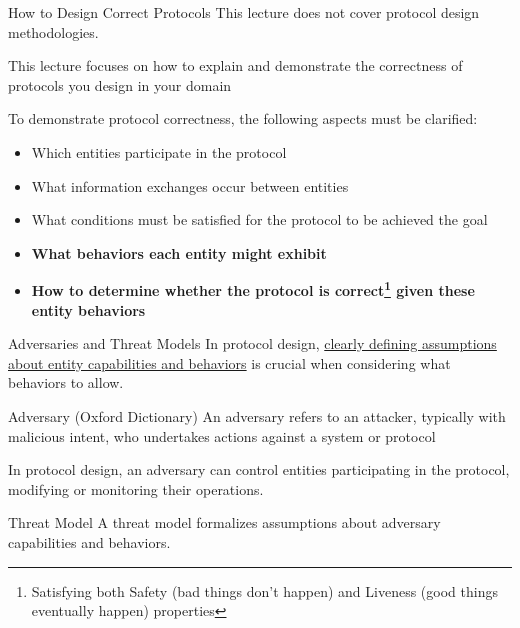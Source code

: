 \documentclass[aspectratio=169,10pt]{beamer}
\newenvironment{proofblock}[1][]
{\begin{block}{#1}\vspace{0.5em}}
{\vspace{0.5em}\end{block}}
\newenvironment{outlineblock}[1][]
{\begin{tcolorbox}[colframe=black, colback=white, boxrule=1pt, boxsep=5pt]}
{\end{tcolorbox}}
\begin{document}
\begin{frame}{How to Design Correct Protocols}
This lecture does not cover protocol design methodologies.

\begin{outlineblock}[]
    This lecture focuses on how to explain and demonstrate the correctness of protocols you design in your domain
\end{outlineblock}

To demonstrate protocol correctness, the following aspects must be clarified:
\begin{itemize}
    \item Which entities participate in the protocol
    \item What information exchanges occur between entities
    \item What conditions must be satisfied for the protocol to be achieved the goal
    \item \textbf{What behaviors each entity might exhibit}
    \item \textbf{How to determine whether the protocol is correct\footnote{Satisfying both Safety (bad things don't happen) and Liveness (good things eventually happen) properties} given these entity behaviors}
\end{itemize}

\end{frame}


\begin{frame}{Adversaries and Threat Models}
In protocol design, \underline{clearly defining assumptions about entity capabilities and behaviors} is crucial when considering what behaviors to allow.

\begin{proofblock}[Adversary (Oxford Dictionary)]
An adversary refers to an attacker, typically with malicious intent, who undertakes actions against a system or protocol
\end{proofblock}

In protocol design, an adversary can control entities participating in the protocol, modifying or monitoring their operations.

\vspace{0.5em}
\begin{proofblock}[Threat Model]
A threat model formalizes assumptions about adversary capabilities and behaviors.
\end{proofblock}

\end{frame}
\end{document}
